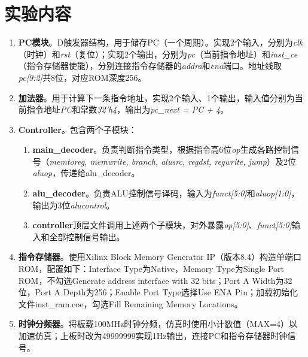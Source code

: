 \section{实验内容}
\begin{enumerate}
    \item \textbf{PC模块}。D触发器结构，用于储存PC（一个周期）。实现2个输入，分别为\textit{clk}（时钟）和\textit{rst}（复位）；实现2个输出，分别为\textit{pc}（当前指令地址）和\textit{inst\_ce}（指令存储器使能），分别连接指令存储器的\textit{addra}和\textit{ena}端口。地址线取\textit{pc[9:2]}共8位，对应ROM深度256。

    \item \textbf{加法器}。用于计算下一条指令地址，实现2个输入、1个输出，输入值分别为当前指令地址\textit{PC}和常数\textit{32'h4}，输出为\textit{pc\_next = PC + 4}。

    \item \textbf{Controller}。包含两个子模块：
    \begin{enumerate}
        \item \textbf{main\_decoder}。负责判断指令类型，根据指令高6位\textit{op}生成各路控制信号（\textit{memtoreg, memwrite, branch, alusrc, regdst, regwrite, jump}）及2位\textit{aluop}，传递给alu\_decoder。
        \item \textbf{alu\_decoder}。负责ALU控制信号译码，输入为\textit{funct[5:0]}和\textit{aluop[1:0]}，输出为3位\textit{alucontrol}。
        \item \textbf{controller}顶层文件调用上述两个子模块，对外暴露\textit{op[5:0]}、\textit{funct[5:0]}输入和全部控制信号输出。
    \end{enumerate}

    \item \textbf{指令存储器}。使用Xilinx Block Memory Generator IP（版本8.4）构造单端口ROM，配置如下：Interface Type为Native，Memory Type为Single Port ROM，不勾选Generate address interface with 32 bits；Port A Width为32位，Port A Depth为256；Enable Port Type选择Use ENA Pin；加载初始化文件inst\_ram.coe，勾选Fill Remaining Memory Locations。

    \item \textbf{时钟分频器}。将板载100MHz时钟分频，仿真时使用小计数值（MAX=4）以加速仿真；上板时改为49999999实现1Hz输出，连接PC和指令存储器时钟信号。
\end{enumerate}
